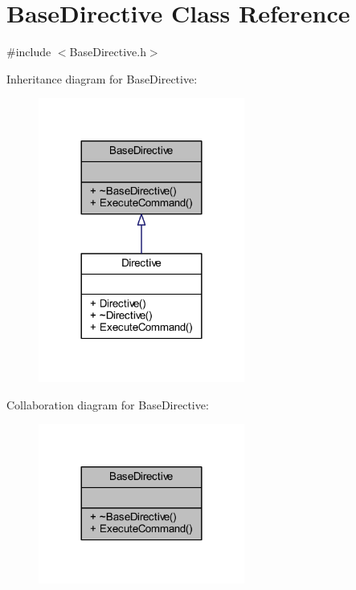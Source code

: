 \hypertarget{class_base_directive}{}\section{Base\+Directive Class Reference}
\label{class_base_directive}


{\ttfamily \#include $<$Base\+Directive.\+h$>$}



Inheritance diagram for Base\+Directive\+:\nopagebreak
\begin{figure}[H]
\begin{center}
\leavevmode
\includegraphics[width=192pt]{class_base_directive__inherit__graph}
\end{center}
\end{figure}


Collaboration diagram for Base\+Directive\+:\nopagebreak
\begin{figure}[H]
\begin{center}
\leavevmode
\includegraphics[width=192pt]{class_base_directive__coll__graph}
\end{center}
\end{figure}
